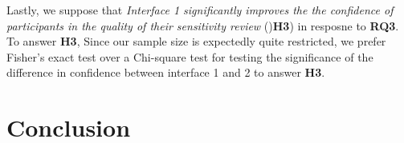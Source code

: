 \documentclass[\version]{l4proj}
\begin{document}
Lastly, we suppose that \textit{Interface 1 significantly improves the the confidence of participants in the quality of their sensitivity review} ()\textbf{H3}) in resposne to \textbf{RQ3}.
To answer \textbf{H3},
Since our sample size is expectedly quite restricted, we prefer Fisher's exact test over a Chi-square test for testing the significance of the difference in confidence between interface 1 and 2 to answer \textbf{H3}.


\chapter{Conclusion}



%
% 
\end{document}
